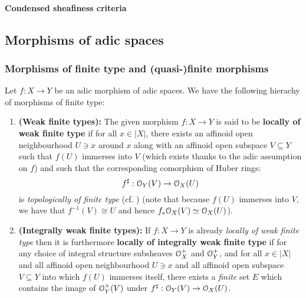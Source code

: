                 \paragraph{Condensed sheafiness criteria}
        
        \subsection{Morphisms of adic spaces}
            \subsubsection{Morphisms of finite type and (quasi-)finite morphisms}
                \begin{definition} \label{def: finite_type_morphisms_between_adic_spaces}    
                    Let $f: X \to Y$ be an adic morphism of adic spaces. We have the following hierachy of morphisms of finite type:
                        \begin{enumerate}
                            \item \textbf{(Weak finite types):} The given morphism $f: X \to Y$ is said to be \textbf{locally of weak finite type} if for all $x \in |X|$, there exists an affinoid open neighbourhood $U \ni x$ around $x$ along with an affinoid open subspace $V \subseteq Y$ such that $f(U)$ immerses into $V$ (which exists thanks to the adic assumption on $f$) and such that the corresponding comorphism of Huber rings:
                                $$f^{\sharp}: \mathcal{O}_Y(V) \to \mathcal{O}_X(U)$$
                            is \textit{topologically of finite type} (cf. \cite[\href{https://stacks.math.columbia.edu/tag/0ANS}{Tag 0ANS}]{stacks}) (note that because $f(U)$ immerses into $V$, we have that $f^{-1}(V) \cong U$ and hence $f_*\mathcal{O}_X(V) \simeq \mathcal{O}_X(U)$). 
                            \item \textbf{(Integrally weak finite types):} If $f: X \to Y$ is already \textit{locally of weak finite type} then it is furthermore \textbf{locally of integrally weak finite type} if for any choice of integral structure subsheaves $\mathcal{O}_X^+$ and $\mathcal{O}_Y^+$, and for all $x \in |X|$ and all affinoid open neighbourhood $U \ni x$ and all affinoid open subspace $V \subseteq Y$ into which $f(U)$ immerses itself, there exists a \textit{finite} set $E$ which contains the image of $\mathcal{O}_Y^+(V)$ under $f^{\sharp}: \mathcal{O}_Y(V) \to \mathcal{O}_X(U)$. 

\end{enumerate}
\end{definition}
